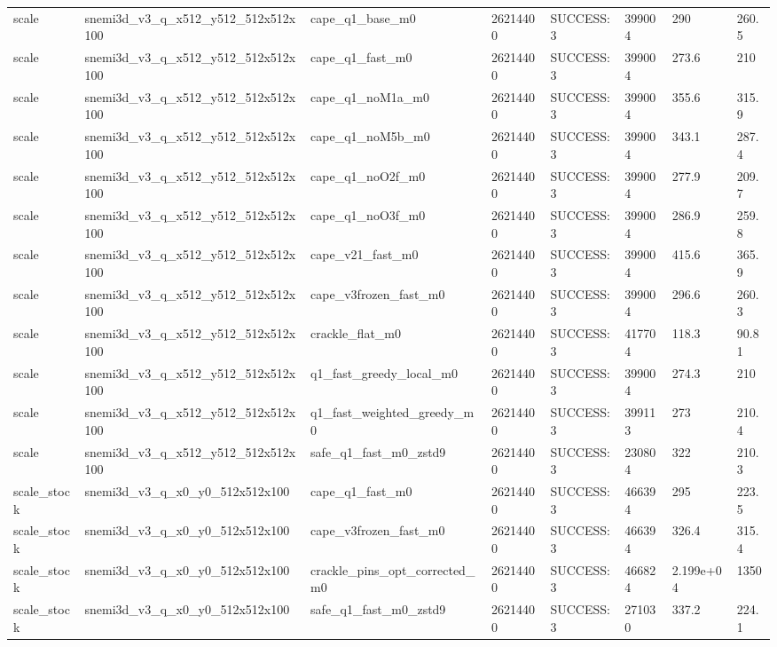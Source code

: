 \begin{table}[t]
\begin{tabular}{llllllll}
scale & snemi3d\_v3\_q\_x512\_y512\_512x512x100 & cape\_q1\_base\_m0 & 26214400 & SUCCESS:3 & 399004 & 290 & 260.5 \\
scale & snemi3d\_v3\_q\_x512\_y512\_512x512x100 & cape\_q1\_fast\_m0 & 26214400 & SUCCESS:3 & 399004 & 273.6 & 210 \\
scale & snemi3d\_v3\_q\_x512\_y512\_512x512x100 & cape\_q1\_noM1a\_m0 & 26214400 & SUCCESS:3 & 399004 & 355.6 & 315.9 \\
scale & snemi3d\_v3\_q\_x512\_y512\_512x512x100 & cape\_q1\_noM5b\_m0 & 26214400 & SUCCESS:3 & 399004 & 343.1 & 287.4 \\
scale & snemi3d\_v3\_q\_x512\_y512\_512x512x100 & cape\_q1\_noO2f\_m0 & 26214400 & SUCCESS:3 & 399004 & 277.9 & 209.7 \\
scale & snemi3d\_v3\_q\_x512\_y512\_512x512x100 & cape\_q1\_noO3f\_m0 & 26214400 & SUCCESS:3 & 399004 & 286.9 & 259.8 \\
scale & snemi3d\_v3\_q\_x512\_y512\_512x512x100 & cape\_v21\_fast\_m0 & 26214400 & SUCCESS:3 & 399004 & 415.6 & 365.9 \\
scale & snemi3d\_v3\_q\_x512\_y512\_512x512x100 & cape\_v3frozen\_fast\_m0 & 26214400 & SUCCESS:3 & 399004 & 296.6 & 260.3 \\
scale & snemi3d\_v3\_q\_x512\_y512\_512x512x100 & crackle\_flat\_m0 & 26214400 & SUCCESS:3 & 417704 & 118.3 & 90.81 \\
scale & snemi3d\_v3\_q\_x512\_y512\_512x512x100 & q1\_fast\_greedy\_local\_m0 & 26214400 & SUCCESS:3 & 399004 & 274.3 & 210 \\
scale & snemi3d\_v3\_q\_x512\_y512\_512x512x100 & q1\_fast\_weighted\_greedy\_m0 & 26214400 & SUCCESS:3 & 399113 & 273 & 210.4 \\
scale & snemi3d\_v3\_q\_x512\_y512\_512x512x100 & safe\_q1\_fast\_m0\_zstd9 & 26214400 & SUCCESS:3 & 230804 & 322 & 210.3 \\
scale\_stock & snemi3d\_v3\_q\_x0\_y0\_512x512x100 & cape\_q1\_fast\_m0 & 26214400 & SUCCESS:3 & 466394 & 295 & 223.5 \\
scale\_stock & snemi3d\_v3\_q\_x0\_y0\_512x512x100 & cape\_v3frozen\_fast\_m0 & 26214400 & SUCCESS:3 & 466394 & 326.4 & 315.4 \\
scale\_stock & snemi3d\_v3\_q\_x0\_y0\_512x512x100 & crackle\_pins\_opt\_corrected\_m0 & 26214400 & SUCCESS:3 & 466824 & 2.199e+04 & 1350 \\
scale\_stock & snemi3d\_v3\_q\_x0\_y0\_512x512x100 & safe\_q1\_fast\_m0\_zstd9 & 26214400 & SUCCESS:3 & 271030 & 337.2 & 224.1 \\

\end{tabular}
\end{table}
